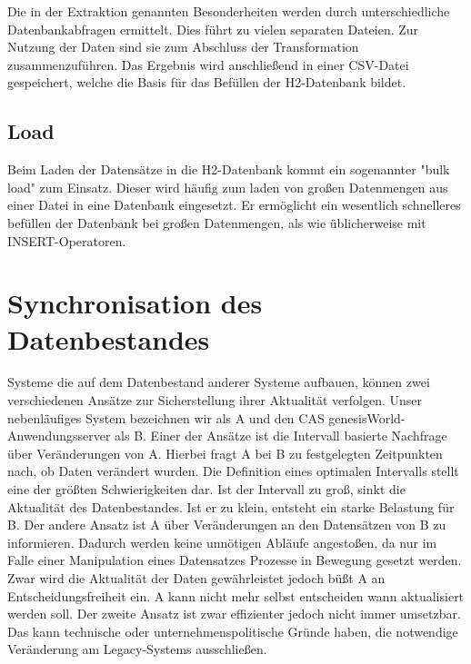 Die in der Extraktion genannten Besonderheiten werden durch unterschiedliche Datenbankabfragen ermittelt. Dies führt zu vielen separaten Dateien. Zur Nutzung der Daten sind sie zum Abschluss der Transformation zusammenzuführen. Das Ergebnis wird anschließend in einer CSV-Datei gespeichert, welche die Basis für das Befüllen der H2-Datenbank bildet. 

\subsection{Load}

Beim Laden der Datensätze in die H2-Datenbank kommt ein sogenannter "bulk load" zum Einsatz. Dieser wird häufig zum laden von großen Datenmengen aus einer Datei in eine Datenbank eingesetzt. Er ermöglicht ein wesentlich schnelleres befüllen der Datenbank bei großen Datenmengen, als wie üblicherweise mit INSERT-Operatoren.

\section{Synchronisation des Datenbestandes}
\label{ch:Konzeption:sec:updatedatenbestand}

Systeme die auf dem Datenbestand anderer Systeme aufbauen, können zwei verschiedenen Ansätze zur Sicherstellung ihrer Aktualität verfolgen. Unser nebenläufiges System bezeichnen wir als A und den CAS genesisWorld-Anwendungsserver als B. Einer der Ansätze ist die Intervall basierte Nachfrage über Veränderungen von A. Hierbei fragt A bei B zu festgelegten Zeitpunkten nach, ob Daten verändert wurden. Die Definition eines optimalen Intervalls stellt eine der größten Schwierigkeiten dar. Ist der Intervall zu groß, sinkt die Aktualität des Datenbestandes. Ist er zu klein, entsteht  ein starke Belastung für B. Der andere Ansatz ist A über Veränderungen an den Datensätzen von B zu informieren. Dadurch werden keine unnötigen Abläufe angestoßen, da nur im Falle einer Manipulation eines Datensatzes Prozesse in Bewegung gesetzt werden. Zwar wird die Aktualität der Daten gewährleistet jedoch büßt A an Entscheidungsfreiheit ein. A kann nicht mehr selbst entscheiden wann aktualisiert werden soll. Der zweite Ansatz ist zwar effizienter jedoch nicht immer umsetzbar. Das kann technische oder unternehmenspolitische Gründe haben, die notwendige Veränderung am Legacy-Systems ausschließen.  

